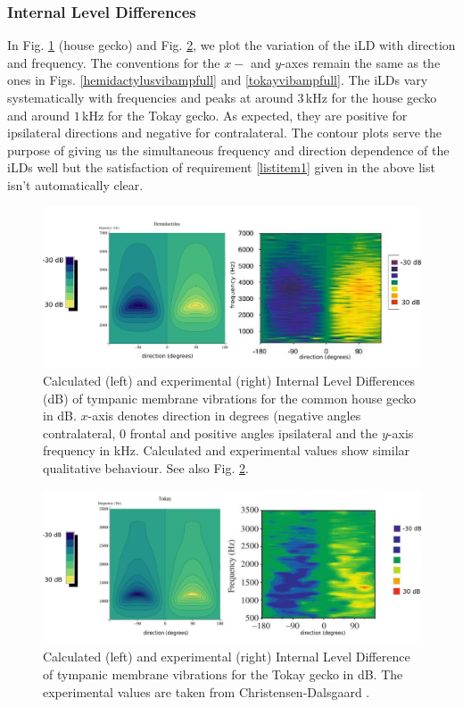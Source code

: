 \subsubsection{Internal Level Differences}
In Fig. \ref{hemidactylusilDboth} (house gecko) and Fig. \ref{tokayilDboth}, we plot the
variation of the iLD with direction and frequency. The conventions for the $x-$ and $y$-axes remain the same as the ones in Figs. \ref{hemidactylusvibampfull}
and \ref{tokayvibampfull}. The iLDs vary systematically with frequencies and peaks at around $3\,$kHz for the house gecko and around $1\,$kHz for the Tokay gecko.
As expected, they are positive for ipsilateral directions and negative for contralateral. The contour plots serve the purpose of giving us the simultaneous frequency and direction dependence of the iLDs well but the 
satisfaction of requirement \ref{listitem1} given in the above list isn't automatically clear.
\begin{figure}[ht!]
 \centering
 \includegraphics[width=1.0\linewidth]{Diagrams/Plots/iLD/hemidactylusiLDboth.png}
 \caption[ILD plots for the common house gecko]{Calculated (left) and experimental (right) Internal Level Differences (dB) of tympanic membrane vibrations for the common house gecko
 in dB. $x$-axis denotes direction in degrees (negative angles contralateral, 0 frontal and positive angles ipsilateral and the $y$-axis frequency in kHz. 
 Calculated and experimental values \cite{dalsgaardmanley2} show similar qualitative behaviour. See also Fig. \ref{tokayilDboth}.}
  \label{hemidactylusilDboth}
\end{figure}

\begin{figure}[ht!]
 \centering
 \includegraphics[width=1.0\linewidth]{Diagrams/Plots/iLD/tokayiLDboth.png}
 \caption[ILD plots for the Tokay gecko]{Calculated (left) and experimental (right) Internal Level Difference of tympanic membrane vibrations for the Tokay gecko
 in dB. The experimental values are taken from Christensen-Dalsgaard \cite{dalsgaardmanley1}.}
  \label{tokayilDboth}
\end{figure}

